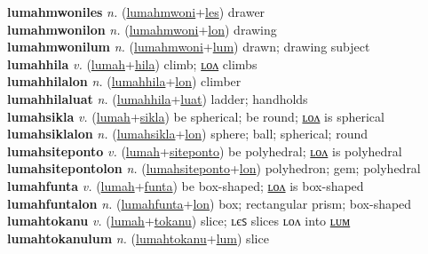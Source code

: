 \textbf{lumahmwoniles} \textit{n.} (\hyperref[lumahmwoni]{lumahmwoni}+\hyperref[les]{les})
drawer \label{lumahmwoniles} \\
\textbf{lumahmwonilon} \textit{n.} (\hyperref[lumahmwoni]{lumahmwoni}+\hyperref[lon]{lon})
drawing \label{lumahmwonilon} \\
\textbf{lumahmwonilum} \textit{n.} (\hyperref[lumahmwoni]{lumahmwoni}+\hyperref[lum]{lum})
drawn; drawing subject \label{lumahmwonilum} \\
\textbf{lumahhila} \textit{v.} (\hyperref[lumah]{lumah}+\hyperref[hila]{hila})
climb; \hyperref[lumahhilalon]{ʟᴏᴧ} climbs \label{lumahhila} \\
\textbf{lumahhilalon} \textit{n.} (\hyperref[lumahhila]{lumahhila}+\hyperref[lon]{lon})
climber \label{lumahhilalon} \\
\textbf{lumahhilaluat} \textit{n.} (\hyperref[lumahhila]{lumahhila}+\hyperref[luat]{luat})
ladder; handholds \label{lumahhilaluat} \\
\textbf{lumahsikla} \textit{v.} (\hyperref[lumah]{lumah}+\hyperref[sikla]{sikla})
be spherical; be round; \hyperref[lumahsiklalon]{ʟᴏᴧ} is spherical \label{lumahsikla} \\
\textbf{lumahsiklalon} \textit{n.} (\hyperref[lumahsikla]{lumahsikla}+\hyperref[lon]{lon})
sphere; ball; spherical; round \label{lumahsiklalon} \\
\textbf{lumahsiteponto} \textit{v.} (\hyperref[lumah]{lumah}+\hyperref[siteponto]{siteponto})
be polyhedral; \hyperref[lumahsitepontolon]{ʟᴏᴧ} is polyhedral \label{lumahsiteponto} \\
\textbf{lumahsitepontolon} \textit{n.} (\hyperref[lumahsiteponto]{lumahsiteponto}+\hyperref[lon]{lon})
polyhedron; gem; polyhedral \label{lumahsitepontolon} \\
\textbf{lumahfunta} \textit{v.} (\hyperref[lumah]{lumah}+\hyperref[funta]{funta})
be box-shaped; \hyperref[lumahfuntalon]{ʟᴏᴧ} is box-shaped \label{lumahfunta} \\
\textbf{lumahfuntalon} \textit{n.} (\hyperref[lumahfunta]{lumahfunta}+\hyperref[lon]{lon})
box; rectangular prism; box-shaped \label{lumahfuntalon} \\
\textbf{lumahtokanu} \textit{v.} (\hyperref[lumah]{lumah}+\hyperref[tokanu]{tokanu})
slice; ʟєꜱ slices ʟᴏᴧ into \hyperref[lumahtokanulum]{ʟᴜᴍ} \label{lumahtokanu} \\
\textbf{lumahtokanulum} \textit{n.} (\hyperref[lumahtokanu]{lumahtokanu}+\hyperref[lum]{lum})
slice \label{lumahtokanulum} \\
